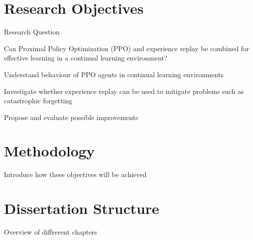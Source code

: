 \section{Research Objectives}
Research Question

Can Proximal Policy Optimization (PPO) and experience replay be combined for effective learning in a continual learning environment?

Understand behaviour of PPO agents in continual learning environments

Investigate whether experience replay can be used to mitigate problems such as catastrophic forgetting

Propose and evaluate possible improvements

\section{Methodology}
Introduce how these objectives will be achieved

\section{Dissertation Structure}
Overview of diffrerent chapters